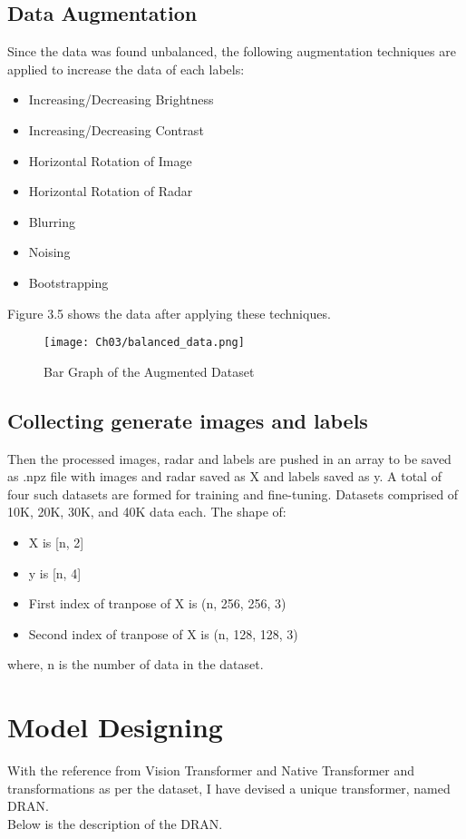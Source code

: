 \subsection{Data Augmentation}
Since the data was found unbalanced, the following augmentation techniques are applied to increase the data of each labels:
\begin{itemize}
    \item Increasing/Decreasing Brightness
    \item Increasing/Decreasing Contrast
    \item Horizontal Rotation of Image
    \item Horizontal Rotation of Radar
    \item Blurring
    \item Noising
    \item Bootstrapping
\end{itemize}
Figure 3.5 shows the data after applying these techniques.
\begin{figure}[h]
    \centering
    \texttt{[image: Ch03/balanced\_data.png]}
    \caption{Bar Graph of the Augmented Dataset}
    \label{figure:5}
\end{figure}
\FloatBarrier

\subsection{Collecting generate images and labels}
Then the processed images, radar and labels are pushed in an array to be saved as .npz file with images and radar saved as X and labels saved as y. A total of four such datasets are formed for training and fine-tuning. Datasets comprised of 10K, 20K, 30K, and 40K data each. The shape of:
\begin{itemize}
    \item X is [n, 2]
    \item y is [n, 4]
    \item First index of tranpose of X is (n, 256, 256, 3)
    \item Second index of tranpose of X is (n, 128, 128, 3)
\end{itemize}
where, n is the number of data in the dataset.

\section{Model Designing}
With the reference from Vision Transformer\cite{dosovitskiy2021image} and Native Transformer\cite{2017arXiv170603762V} and transformations as per the dataset, I have devised a unique transformer, named DRAN.
\\
Below is the description of the DRAN. 

